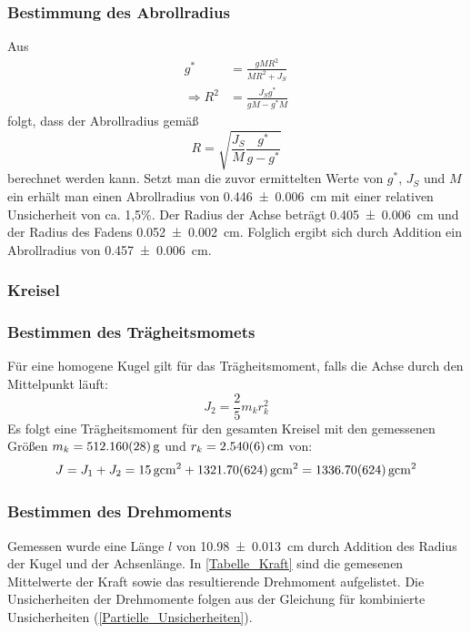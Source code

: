 \documentclass[
	a4paper,
	12pt,
	pagesize,
	ngerman
]{scrartcl}
\begin{document}
	\subsubsection*{Bestimmung des Abrollradius}
	Aus
	\begin{align}
		g^* &= \frac{gMR^2}{MR^2+J_S} \\
		\Rightarrow R^2 &= \frac{J_Sg^*}{gM-g^*M}
	\end{align}
	folgt, dass der Abrollradius gemäß 
	\begin{equation}
		R = \sqrt{\frac{J_S}{M}\frac{g^*}{g-g^*}}
	\end{equation}
	berechnet werden kann. 
	Setzt man die zuvor ermittelten Werte von $g^*$, $J_S$ und $M$ ein erhält man einen Abrollradius von \SI{0,446 \pm 0,006}{cm} mit einer relativen Unsicherheit von ca. 1,5\%. %
	Der Radius der Achse beträgt \SI{0,405 \pm 0,006}{cm} und der Radius des Fadens \SI{0,052\pm 0,002}{cm}. 
	Folglich ergibt sich durch Addition ein Abrollradius von \SI{0,457 \pm 0,006}{cm}.

	\subsubsection{Kreisel}
	\subsubsection*{Bestimmen des Trägheitsmomets}
	Für eine homogene Kugel gilt für das Trägheitsmoment, falls die Achse durch den Mittelpunkt läuft:
	\begin{equation}
		\label{KugelTraegheitsmoment}
		J_2=\frac{2}{5}m_kr_k^2
	\end{equation}
	Es folgt eine Trägheitsmoment für den gesamten Kreisel mit den gemessenen Größen $m_k = \SI{512,16\pm 0,028}{g}$ und $r_k = \SI{2,54\pm 0,006}{cm}$ von:
	\begin{equation}
		J = J_1 + J_2 = \SI{15}{g cm^2} + \SI{1321,70\pm 6,24}{g cm^2} = \SI{1336,70 \pm 6,24}{g cm^2}
		\label{GesamtTraeg}
	\end{equation}
	\subsubsection*{Bestimmen des Drehmoments}
	Gemessen wurde eine Länge $l$ von \SI{10,98 \pm 0,013}{cm} durch Addition des Radius der Kugel und der Achsenlänge. 
	In \cref{Tabelle_Kraft} sind die gemesenen Mittelwerte der Kraft sowie das resultierende Drehmoment aufgelistet. 
	Die Unsicherheiten der Drehmomente folgen aus der Gleichung für kombinierte Unsicherheiten (\cref{Partielle_Unsicherheiten}). %
\end{document}
